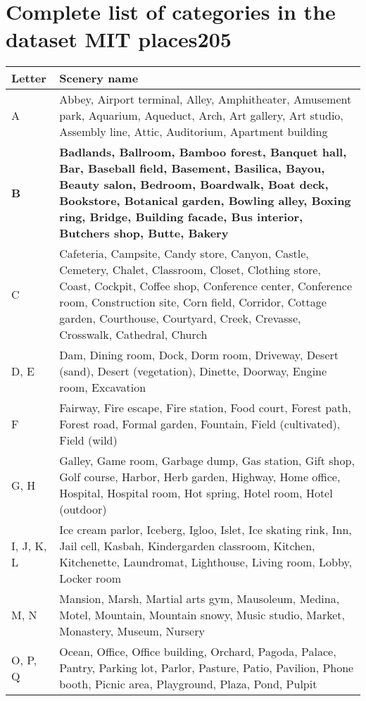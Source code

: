 \chapter{Complete list of categories in the dataset MIT places205}

\begin{table}[H]
\centering
\begin{scriptsize}

\begin{tabular}{|L{1.5cm} | L{13cm} |}
\hline\textbf{Letter} & \textbf{Scenery name} \\ \hline
A & Abbey, Airport terminal, Alley, Amphitheater, Amusement park, Aquarium, Aqueduct, Arch, Art gallery, Art studio, Assembly line, Attic, Auditorium, Apartment building \\\hline
\textbf{B} & \textbf{Badlands, Ballroom, Bamboo forest, Banquet hall, Bar, Baseball field, Basement, Basilica, Bayou, Beauty salon, Bedroom, Boardwalk, Boat deck, Bookstore, Botanical garden, Bowling alley, Boxing ring, Bridge, Building facade, Bus interior, Butchers shop, Butte, Bakery} \\\hline
C & Cafeteria, Campsite, Candy store, Canyon, Castle, Cemetery, Chalet, Classroom, Closet, Clothing store, Coast, Cockpit, Coffee shop, Conference center, Conference room, Construction site, Corn field, Corridor, Cottage garden, Courthouse, Courtyard, Creek, Crevasse, Crosswalk, Cathedral, Church \\\hline
D, E & Dam, Dining room, Dock, Dorm room, Driveway, Desert (sand), Desert (vegetation), Dinette, Doorway, Engine room, Excavation \\\hline
F & Fairway, Fire escape, Fire station, Food court, Forest path, Forest road, Formal garden, Fountain, Field (cultivated), Field (wild)\\\hline
G, H & Galley, Game room, Garbage dump, Gas station, Gift shop, Golf course, Harbor, Herb garden, Highway, Home office, Hospital, Hospital room, Hot spring, Hotel room, Hotel (outdoor)\\\hline
I, J, K, L & Ice cream parlor, Iceberg, Igloo, Islet, Ice skating rink, Inn, Jail cell, Kasbah, Kindergarden classroom, Kitchen, Kitchenette, Laundromat, Lighthouse, Living room, Lobby, Locker room\\\hline
M, N & Mansion, Marsh, Martial arts gym, Mausoleum, Medina, Motel, Mountain, Mountain snowy, Music studio, Market, Monastery, Museum, Nursery\\\hline
O, P, Q & Ocean, Office, Office building, Orchard, Pagoda, Palace, Pantry, Parking lot, Parlor, Pasture, Patio, Pavilion, Phone booth, Picnic area, Playground, Plaza, Pond, Pulpit\\\hline

\end{tabular}
\end{scriptsize}
\end{table}
